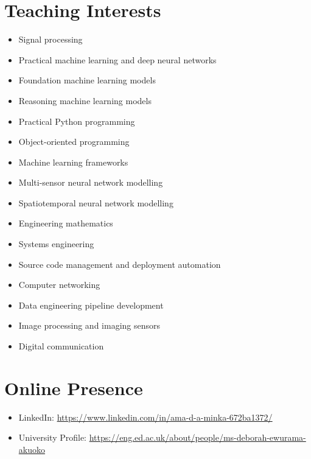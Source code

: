 \documentclass[11pt,a4paper]{article}
\begin{document}
\section*{Teaching Interests}
\begin{itemize}[leftmargin=*,nosep]
    \item Signal processing
    \item Practical machine learning and deep neural networks
    \item Foundation machine learning models
    \item Reasoning machine learning models
    \item Practical Python programming
    \item Object-oriented programming
    \item Machine learning frameworks
    \item Multi-sensor neural network modelling
    \item Spatiotemporal neural network modelling
    \item Engineering mathematics
    \item Systems engineering
    \item Source code management and deployment automation
    \item Computer networking
    \item Data engineering pipeline development
    \item Image processing and imaging sensors
    \item Digital communication
\end{itemize}

\section*{Online Presence}
\begin{itemize}[leftmargin=*,nosep]
    \item LinkedIn: \url{https://www.linkedin.com/in/ama-d-a-minka-672ba1372/}
    \item University Profile: \url{https://eng.ed.ac.uk/about/people/ms-deborah-ewurama-akuoko}
\end{itemize}
\end{document}
